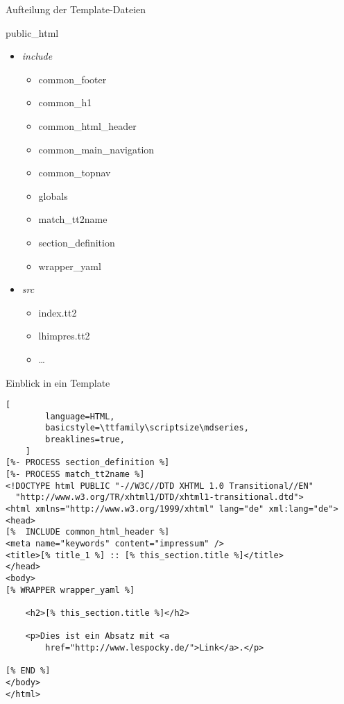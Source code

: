 \documentclass[hyperref={pdfpagelabels=false}]{beamer}
\begin{document}
\begin{frame}{Aufteilung der Template-Dateien}
    \begin{block}{public\_html}
        \begin{itemize}
            \item \emph{include}
                \begin{itemize}
                    \item common\_footer
                    \item common\_h1
                    \item common\_html\_header
                    \item common\_main\_navigation
                    \item common\_topnav
                    \item globals
                    \item match\_tt2name
                    \item section\_definition
                    \item wrapper\_yaml
                \end{itemize}
            \item \emph{src}
                \begin{itemize}
                    \item index.tt2
                    \item lhimpres.tt2
                    \item \dots
                \end{itemize}
        \end{itemize}
    \end{block}
\end{frame}

\begin{frame}[fragile]{Einblick in ein Template}
    \begin{lstlisting}[
        language=HTML,
        basicstyle=\ttfamily\scriptsize\mdseries,
        breaklines=true,
    ]
[%- PROCESS section_definition %]
[%- PROCESS match_tt2name %]
<!DOCTYPE html PUBLIC "-//W3C//DTD XHTML 1.0 Transitional//EN"
  "http://www.w3.org/TR/xhtml1/DTD/xhtml1-transitional.dtd">
<html xmlns="http://www.w3.org/1999/xhtml" lang="de" xml:lang="de">
<head>
[%  INCLUDE common_html_header %]
<meta name="keywords" content="impressum" />
<title>[% title_1 %] :: [% this_section.title %]</title>
</head>
<body>
[% WRAPPER wrapper_yaml %]

    <h2>[% this_section.title %]</h2>

    <p>Dies ist ein Absatz mit <a 
        href="http://www.lespocky.de/">Link</a>.</p>

[% END %]
</body>
</html>
    \end{lstlisting}
\end{frame}
\end{document}
